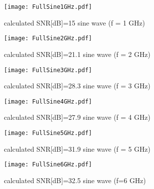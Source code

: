 \begin{figure}[h]
   \centering
   \texttt{[image: FullSine1GHz.pdf]}
   \caption{calculated SNR[dB]=15 sine wave (f = 1 GHz)}
   \label{fig:snr1GHz}
\end{figure}

\begin{figure}[h]
   \centering
   \texttt{[image: FullSine2GHz.pdf]}
   \caption{calculated SNR[dB]=21.1 sine wave (f = 2 GHz)}
   \label{fig:snr2GHz}
\end{figure}

\begin{figure}[h]
   \centering
   \texttt{[image: FullSine3GHz.pdf]}
   \caption{calculated SNR[dB]=28.3 sine wave (f = 3 GHz)}
   \label{fig:snr3GHz}
\end{figure}

\begin{figure}[h]
   \centering
   \texttt{[image: FullSine4GHz.pdf]}
   \caption{calculated SNR[dB]=27.9 sine wave (f = 4 GHz)}
   \label{fig:snr4GHz}
\end{figure}

\begin{figure}[h]
   \centering
   \texttt{[image: FullSine5GHz.pdf]}
   \caption{calculated SNR[dB]=31.9 sine wave (f = 5 GHz)}
   \label{fig:snr5GHz}
\end{figure}

\begin{figure}[h]
   \centering
   \texttt{[image: FullSine6GHz.pdf]}
   \caption{calculated SNR[dB]=32.5 sine wave (f=6 GHz)}
   \label{pic:DemonstratorDDRiXY6}
\end{figure}
